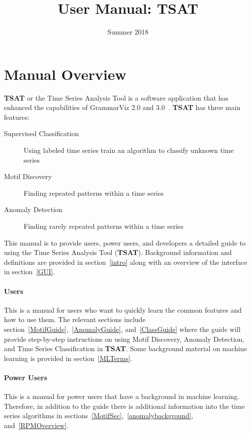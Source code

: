 \documentclass[titlepage, letterpaper, 12pt]{article}
\newcommand\TSAT{\textbf{TSAT}}
\begin{document}
\title{User Manual: TSAT}
\date{Summer 2018}
\maketitle

\tableofcontents
\newpage

\section{Manual Overview}

{\TSAT} or the Time Series Analysis Tool is a software application that has enhanced the capabilities of GrammarViz 2.0 and 3.0~\cite{senin-anomaly,senin-gv2,senin-gv3}.  {\TSAT} has three main features:
\begin{description}
	\item[Supervised Classification] Using labeled time series train an algorithm to classify unknown time series
	\item[Motif Discovery] Finding repeated patterns within a time series
	\item[Anomaly Detection] Finding rarely repeated patterns within a time series
\end{description}

This manual is to provide users, power users, and developers a detailed guide to using the Time Series Analysis Tool ({\TSAT}).  Background information and definitions are provided in section~\ref{intro} along with an overview of the interface in section~\ref{GUI}.

\paragraph{Users} This is a manual for users who want to quickly learn the common features and how to use them.  The relevant sections include section~\ref{MotifGuide},~\ref{AnomalyGuide}, and~\ref{ClassGuide} where the guide will provide step-by-step instructions on using Motif Discovery, Anomaly Detection, and Time Series Classification in {\TSAT}.  Some background material on machine learning is provided in section~\ref{MLTerms}. 

\paragraph{Power Users} This is a manual for power users that have a background in machine learning.  Therefore, in addition to the guide there is additional information into the time series algorithms in sections~\ref{MotifSec},~\ref{anomalybackground}, and~\ref{RPMOverview}.
\end{document}
